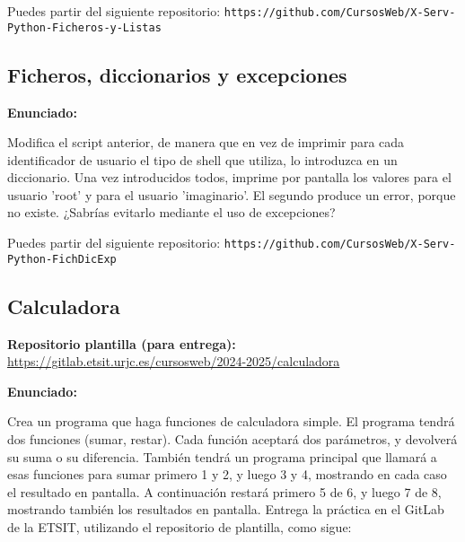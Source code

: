 Puedes partir del siguiente repositorio: \verb|https://github.com/CursosWeb/X-Serv-Python-Ficheros-y-Listas|

\subsection{Ficheros, diccionarios y excepciones}
\label{subsec:ficheros-dic-excep}

\textbf{Enunciado:}

Modifica el script
anterior, de manera que en vez de imprimir para cada identificador de usuario el tipo
de shell que utiliza, lo introduzca en un diccionario. Una vez introducidos todos, imprime por pantalla los valores para el usuario 'root' y para el
usuario 'imaginario'. El segundo produce un error, porque no existe. ¿Sabrías evitarlo mediante el uso de
excepciones?

Puedes partir del siguiente repositorio: \verb|https://github.com/CursosWeb/X-Serv-Python-FichDicExp|

\subsection{Calculadora}
\label{subsec:calculadora}

\textbf{Repositorio plantilla (para entrega):} \\
\url{https://gitlab.etsit.urjc.es/cursosweb/2024-2025/calculadora}

\textbf{Enunciado:}

Crea un programa que haga funciones de calculadora simple. El programa tendrá dos funciones (sumar, restar). Cada función aceptará dos parámetros, y devolverá su suma o su diferencia. También tendrá un programa principal que llamará a esas funciones para sumar primero 1 y 2, y luego 3 y 4, mostrando en cada caso el resultado en pantalla. A continuación restará primero 5 de 6, y luego 7 de 8, mostrando también los resultados en pantalla. Entrega la práctica en el GitLab de la ETSIT, utilizando el repositorio de plantilla, como sigue:

